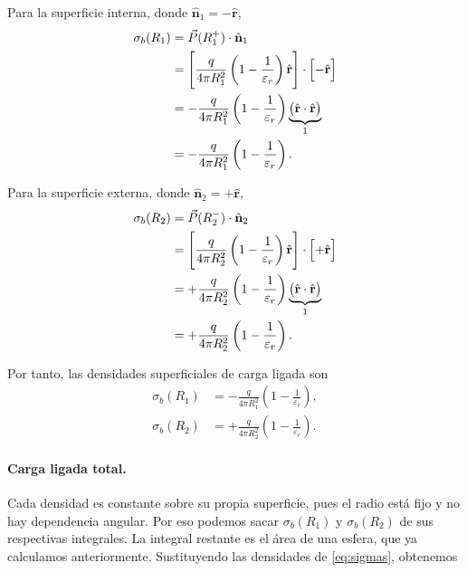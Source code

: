 \documentclass[11pt]{article}
\newcommand{\er}{\hat{\mathbf r}}
\newcommand{\normal}{\hat{\mathbf n}}
\begin{document}
\begingroup
\setlength{\jot}{7pt}

Para la superficie interna, donde $\normal_1=-\er$,
\begin{align*}
  \sigma_b(R_1)
    &=\vec P(R_1^+)\cdot\normal_1\\
    &=\Biggl[
        \frac{q}{4\pi R_1^2}
        \left(1-\frac{1}{\varepsilon_r}\right)\er
      \Biggr]
      \cdot\Bigl[-\er\Bigr]\\
    &=-\frac{q}{4\pi R_1^2}
      \left(1-\frac{1}{\varepsilon_r}\right)
      \underbrace{\bigl(\er\cdot\er\bigr)}_{1}\\
    &=-\frac{q}{4\pi R_1^2}
      \left(1-\frac{1}{\varepsilon_r}\right).
\end{align*}

Para la superficie externa, donde $\normal_2=+\er$,
\begin{align*}
  \sigma_b(R_2)
    &=\vec P(R_2^-)\cdot\normal_2\\
    &=\Biggl[
        \frac{q}{4\pi R_2^2}
        \left(1-\frac{1}{\varepsilon_r}\right)\er
      \Biggr]
      \cdot\Bigl[+\er\Bigr]\\
    &=+\frac{q}{4\pi R_2^2}
      \left(1-\frac{1}{\varepsilon_r}\right)
      \underbrace{\bigl(\er\cdot\er\bigr)}_{1}\\
    &=+\frac{q}{4\pi R_2^2}
      \left(1-\frac{1}{\varepsilon_r}\right).
\end{align*}

Por tanto, las densidades superficiales de carga ligada son
\begin{equation}
  \boxed{
  \begin{aligned}
    \sigma_b(R_1)
      &=-\frac{q}{4\pi R_1^2}
        \left(1-\frac{1}{\varepsilon_r}\right),\\[7pt]
    \sigma_b(R_2)
      &=+\frac{q}{4\pi R_2^2}
        \left(1-\frac{1}{\varepsilon_r}\right).
  \end{aligned}
  }
  \label{eq:sigmas}
\end{equation}

\paragraph{Carga ligada total.}

Cada densidad es constante sobre su propia superficie,
pues el radio está fijo y no hay dependencia angular.
Por eso podemos sacar $\sigma_b(R_1)$ y $\sigma_b(R_2)$
de sus respectivas integrales. La integral restante es
el área de una esfera, que ya calculamos anteriormente.
Sustituyendo las densidades de \eqref{eq:sigmas}, obtenemos
\end{document}
